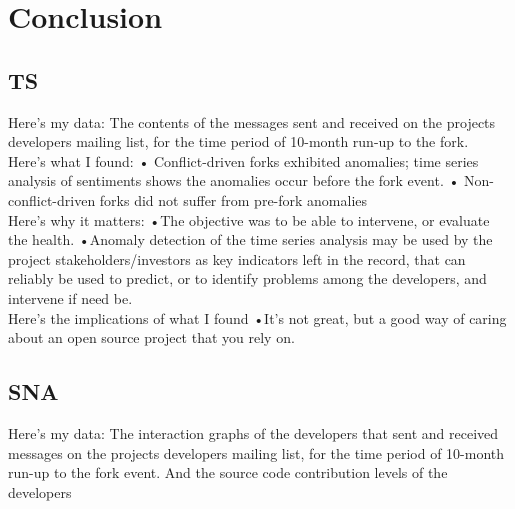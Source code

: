 \documentclass[12pt]{report}
\begin{document}
\pagebreak
\section{Conclusion}
\label{Discussion}

\subsection{TS}
Here’s my data:
The contents of the messages sent and received on the projects developers mailing
list, for the time period of 10-month run-up to the fork.\\

Here’s what I found:
• Conflict-driven forks exhibited anomalies; time series analysis of sentiments shows the
anomalies occur before the fork event.
• Non-conflict-driven forks did not suffer from pre-fork anomalies\\

Here’s why it matters:
•The objective was to be able to intervene, or evaluate the health.
•Anomaly detection of the time series analysis may be used by the project
stakeholders/investors as key indicators left in the record, that can reliably be used to predict, or to identify problems among the developers, and intervene if need be.\\

Here’s the implications of what I found
•It’s not great, but a good way of caring about an open source project that you rely on.


\subsection{SNA}

Here’s my data:
The interaction graphs of the developers that sent and received messages on the projects developers mailing list, for the time period of 10-month run-up to the fork event. And the source code contribution levels of the developers\\
\end{document}
